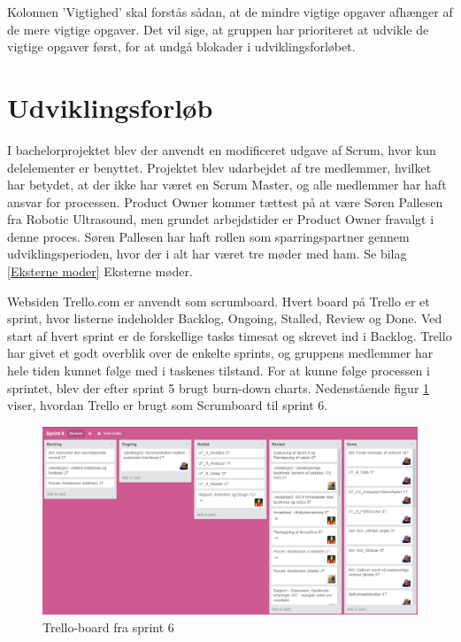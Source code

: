 Kolonnen 'Vigtighed' skal forstås sådan, at de mindre vigtige opgaver afhænger af de mere vigtige opgaver. 
Det vil sige, at gruppen har prioriteret at udvikle de vigtige opgaver først, for at undgå blokader i udviklingsforløbet.


\section{Udviklingsforløb} \label{Udviklingsforlob}
I bachelorprojektet blev der anvendt en modificeret udgave af Scrum, hvor kun delelementer er benyttet. Projektet blev udarbejdet af tre medlemmer, hvilket har betydet, at der ikke har været en Scrum Master, og alle medlemmer har haft ansvar for processen. Product Owner kommer tættest på at være Søren Pallesen fra Robotic Ultrasound, men grundet arbejdstider er Product Owner fravalgt i denne proces. Søren Pallesen har haft rollen som sparringspartner gennem udviklingsperioden, hvor der i alt har været tre møder med ham. Se bilag \ref{Eksterne moder} Eksterne møder. 

Websiden Trello.com er anvendt som scrumboard. Hvert board på Trello er et sprint, hvor listerne indeholder Backlog, Ongoing, Stalled, Review og Done. Ved start af hvert sprint er de forskellige tasks timesat og skrevet ind i Backlog. Trello har givet et godt overblik over de enkelte sprints, og gruppens medlemmer har hele tiden kunnet følge med i taskenes tilstand. For at kunne følge processen i sprintet, blev der efter sprint 5 brugt burn-down charts. 
\newpage
Nedenstående figur \ref{Trello} viser, hvordan Trello er brugt som Scrumboard til sprint 6. 

\begin{figure}[H]
    \centering
    \includegraphics[width=1\textwidth]{figurer/d/Trello}
    \caption{Trello-board fra sprint 6}
    \label{Trello}
\end{figure}

